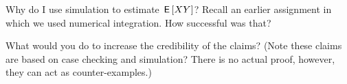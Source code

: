 \begin{exercise}
Why do I use simulation to estimate $\,\mathsf{E}\left[XY\right]$? Recall an earlier assignment in which we used numerical  integration. How successful was that?
\end{exercise}

\begin{exercise}
What would you do to increase the credibility of the claims? (Note these claims  are based on case checking and simulation? There is no actual proof, however, they can act as counter-examples.)
\end{exercise}


